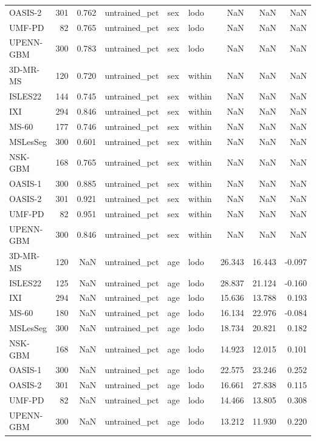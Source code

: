 \begin{tabular}{lrrlllrrr}
OASIS-2 & 301 & 0.762 & untrained\_pct & sex & lodo & NaN & NaN & NaN \\
UMF-PD & 82 & 0.765 & untrained\_pct & sex & lodo & NaN & NaN & NaN \\
UPENN-GBM & 300 & 0.783 & untrained\_pct & sex & lodo & NaN & NaN & NaN \\
3D-MR-MS & 120 & 0.720 & untrained\_pct & sex & within & NaN & NaN & NaN \\
ISLES22 & 144 & 0.745 & untrained\_pct & sex & within & NaN & NaN & NaN \\
IXI & 294 & 0.846 & untrained\_pct & sex & within & NaN & NaN & NaN \\
MS-60 & 177 & 0.746 & untrained\_pct & sex & within & NaN & NaN & NaN \\
MSLesSeg & 300 & 0.601 & untrained\_pct & sex & within & NaN & NaN & NaN \\
NSK-GBM & 168 & 0.765 & untrained\_pct & sex & within & NaN & NaN & NaN \\
OASIS-1 & 300 & 0.885 & untrained\_pct & sex & within & NaN & NaN & NaN \\
OASIS-2 & 301 & 0.921 & untrained\_pct & sex & within & NaN & NaN & NaN \\
UMF-PD & 82 & 0.951 & untrained\_pct & sex & within & NaN & NaN & NaN \\
UPENN-GBM & 300 & 0.846 & untrained\_pct & sex & within & NaN & NaN & NaN \\
3D-MR-MS & 120 & NaN & untrained\_pct & age & lodo & 26.343 & 16.443 & -0.097 \\
ISLES22 & 125 & NaN & untrained\_pct & age & lodo & 28.837 & 21.124 & -0.160 \\
IXI & 294 & NaN & untrained\_pct & age & lodo & 15.636 & 13.788 & 0.193 \\
MS-60 & 180 & NaN & untrained\_pct & age & lodo & 16.134 & 22.976 & -0.084 \\
MSLesSeg & 300 & NaN & untrained\_pct & age & lodo & 18.734 & 20.821 & 0.182 \\
NSK-GBM & 168 & NaN & untrained\_pct & age & lodo & 14.923 & 12.015 & 0.101 \\
OASIS-1 & 300 & NaN & untrained\_pct & age & lodo & 22.575 & 23.246 & 0.252 \\
OASIS-2 & 301 & NaN & untrained\_pct & age & lodo & 16.661 & 27.838 & 0.115 \\
UMF-PD & 82 & NaN & untrained\_pct & age & lodo & 14.466 & 13.805 & 0.308 \\
UPENN-GBM & 300 & NaN & untrained\_pct & age & lodo & 13.212 & 11.930 & 0.220 \\

\end{tabular}
